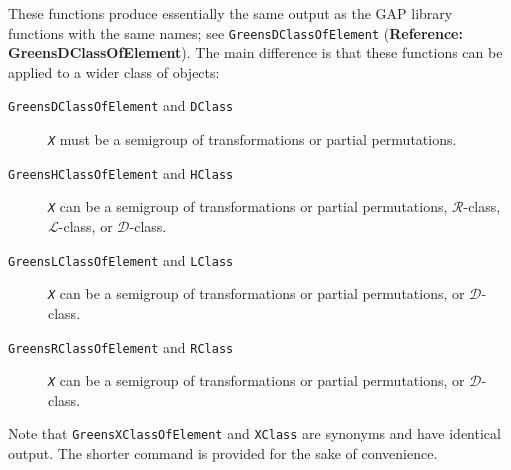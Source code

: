 \documentclass[a4paper,11pt]{report}
\begin{document}
{{{ These functions produce essentially the same output as the \textsf{GAP} library functions with the same names; see \texttt{GreensDClassOfElement} (\textbf{Reference: GreensDClassOfElement}). The main difference is that these functions can be applied to a wider class
of objects: 
\begin{description}
\item[{\texttt{GreensDClassOfElement} and \texttt{DClass}}]  \mbox{\texttt{\mdseries\slshape X}} must be a semigroup of transformations or partial permutations. 
\item[{\texttt{GreensHClassOfElement} and \texttt{HClass}}]  \mbox{\texttt{\mdseries\slshape X}} can be a semigroup of transformations or partial permutations, $\mathcal{R}$-class, $\mathcal{L}$-class, or $\mathcal{D}$-class. 
\item[{\texttt{GreensLClassOfElement} and \texttt{LClass}}]  \mbox{\texttt{\mdseries\slshape X}} can be a semigroup of transformations or partial permutations, or $\mathcal{D}$-class. 
\item[{\texttt{GreensRClassOfElement} and \texttt{RClass}}]  \mbox{\texttt{\mdseries\slshape X}} can be a semigroup of transformations or partial permutations, or $\mathcal{D}$-class. 
\end{description}
 Note that \texttt{GreensXClassOfElement} and \texttt{XClass} are synonyms and have identical output. The shorter command is provided for
the sake of convenience.

 }

 
}}
\end{document}
